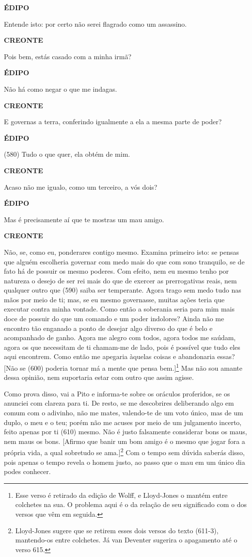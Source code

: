 \textbf{ÉDIPO}

Entende isto: por certo não serei flagrado como um assassino.

\textbf{CREONTE}

Pois bem, estás casado com a minha irmã?

\textbf{ÉDIPO}

Não há como negar o que me indagas.

\textbf{CREONTE}

E governas a terra, conferindo igualmente a ela a mesma parte de poder?

\textbf{ÉDIPO}

(580) Tudo o que quer, ela obtém de mim.

\textbf{CREONTE}

Acaso não me igualo, como um terceiro, a vós dois?

\textbf{ÉDIPO}

Mas é precisamente aí que te mostras um mau amigo.

\textbf{CREONTE}

Não, se, como eu, ponderares contigo mesmo. Examina primeiro isto: se
pensas que alguém escolheria governar com medo mais do que com sono
tranquilo, se de fato há de possuir os mesmo poderes. Com efeito, nem eu
mesmo tenho por natureza o desejo de ser rei mais do que de exercer as
prerrogativas reais, nem qualquer outro que (590) saiba ser temperante.
Agora trago sem medo tudo nas mãos por meio de ti; mas, se eu mesmo
governasse, muitas ações teria que executar contra minha vontade. Como
então a soberania seria para mim mais doce de possuir do que um comando
e um poder indolores? Ainda não me encontro tão enganado a ponto de
desejar algo diverso do que é belo e acompanhado de ganho. Agora me
alegro com todos, agora todos me saúdam, agora os que necessitam de ti
chamam-me de lado, pois é possível que tudo eles aqui encontrem. Como
então me apegaria àquelas coisas e abandonaria essas? {[}Não se (600)
poderia tornar má a mente que pensa bem.{]}\footnote{Esse verso é
  retirado da edição de Wolff, e Lloyd-Jones o mantém entre colchetes na
  sua. O problema aqui é o da relação de seu significado com o dos
  versos que vêm em seguida.} Mas não sou amante dessa opinião, nem
suportaria estar com outro que assim agisse.

Como prova disso, vai a Pito e informa-te sobre os oráculos proferidos,
se os anunciei com clareza para ti. De resto, se me descobrires
deliberando algo em comum com o adivinho, não me mates, valendo-te de um
voto único, mas de um duplo, o meu e o teu; porém não me acuses por meio
de um julgamento incerto, feito apenas por ti (610) mesmo. Não é justo
falsamente considerar bons os maus, nem maus os bons. {[}Afirmo que
banir um bom amigo é o mesmo que jogar fora a própria vida, a qual
sobretudo se ama.{]}\footnote{Lloyd-Jones sugere que se retirem esses
  dois versos do texto (611-3), mantendo-os entre colchetes. Já van
  Deventer sugerira o apagamento até o verso 615.} Com o tempo sem
dúvida saberás disso, pois apenas o tempo revela o homem justo, ao passo
que o mau em um único dia podes conhecer.

